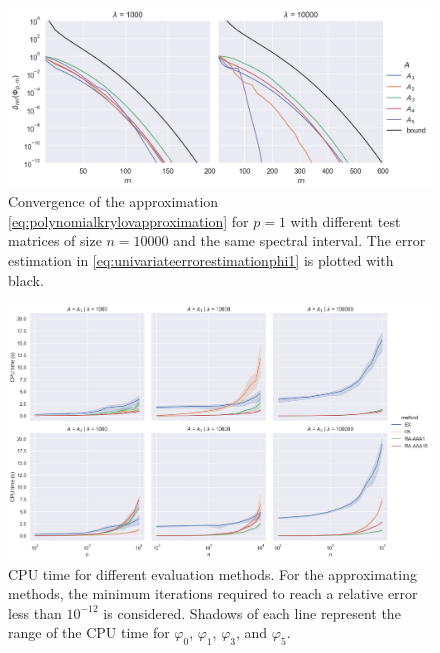 
\begin{figure}[h]
    \centering
    \includegraphics[width=\textwidth]{img/krylovapproximation/cnvg_matrices_PA_n10000.png}
    \caption{Convergence of the approximation \eqref{eq:polynomialkrylovapproximation}
    for $p=1$ with different test matrices of size $n=10000$ and the same spectral interval.
    The error estimation in \eqref{eq:univariateerrorestimationphi1} is plotted with black.}
    \label{fig:krylovapproximationmatrices}
\end{figure}

\begin{figure}[h]
    \centering
    \includegraphics[width=.9\textwidth]{img/krylovapproximation/cputime_methods.png}
    \caption{
        CPU time for different evaluation methods. For the approximating methods,
        the minimum iterations required to reach a relative error less than $10^{-12}$
        is considered. Shadows of each line represent the range of the CPU time for
        $\varphi_0$, $\varphi_1$, $\varphi_3$, and $\varphi_5$.
    }
    \label{fig:krylovapproximationcputime}
\end{figure}


